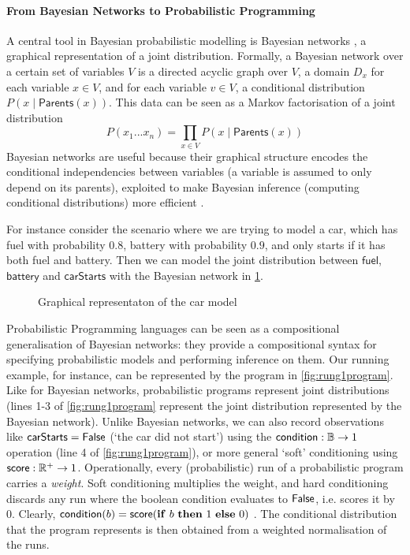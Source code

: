 \documentclass[11pt,a4paper]{article}
\begin{document}
\paragraph{From Bayesian Networks to Probabilistic Programming} A central tool in Bayesian probabilistic modelling is Bayesian networks , a graphical representation of a joint distribution. Formally, a Bayesian network over a certain set of variables $V$ is a directed acyclic graph over $V$, a domain $D_x$ for each variable $x \in V$, and for each variable $v \in V$, a conditional distribution $P(x \mid \mathsf{Parents}(x))$. This data can be seen as a Markov factorisation of a joint distribution $$P(x_1...x_n) = \prod_{x\in V} P(x \mid \mathsf{Parents}(x))$$
Bayesian networks are useful because their graphical structure encodes the conditional independencies between variables (a variable is assumed to only depend on its parents), exploited to make Bayesian inference (computing conditional distributions) more efficient . 

For instance consider the scenario where we are trying to model a car, which has fuel with probability $0.8$, battery with probability $0.9$, and only starts if it has both fuel and battery. Then we can model the joint distribution between $\mathsf{fuel}$, $\mathsf{battery}$ and $\mathsf{carStarts}$ with the Bayesian network in \cref{fig:rung1car}. 

\begin{figure}
    \centering
{}
    \caption{Graphical representaton of the car model }
    \label{fig:rung1car}
\end{figure}

Probabilistic Programming languages can be seen as a compositional generalisation of Bayesian networks: they provide a compositional syntax for specifying probabilistic models and performing inference on them. Our running example, for instance, can be represented by the program in \cref{fig:rung1program}. Like for Bayesian networks, probabilistic programs represent joint distributions (lines 1-3 of \cref{fig:rung1program} represent the joint distribution represented by the Bayesian network). Unlike Bayesian networks, we can also record observations like $\mathsf{carStarts}=\mathsf{False}$ (`the car did not start') using the $\mathsf{condition}: \mathbb{B} \to 1$ operation (line 4 of \cref{fig:rung1program}), or more general `soft' conditioning using $\mathsf{score}: \mathbb{R}^+ \to 1$. Operationally, every (probabilistic) run of a probabilistic program carries a \emph{weight}. Soft conditioning multiplies the weight, and hard conditioning discards any run where the boolean condition evaluates to $\mathsf{False}$, i.e. scores it by $0$. Clearly, $\mathsf{condition}(b) = \mathsf{score}(\mathbf{if} \ b \ \mathbf{then} \ 1 \ \mathbf{else} \ 0)$ . The conditional distribution that the program represents is then obtained from a weighted normalisation of the runs. 
\end{document}
